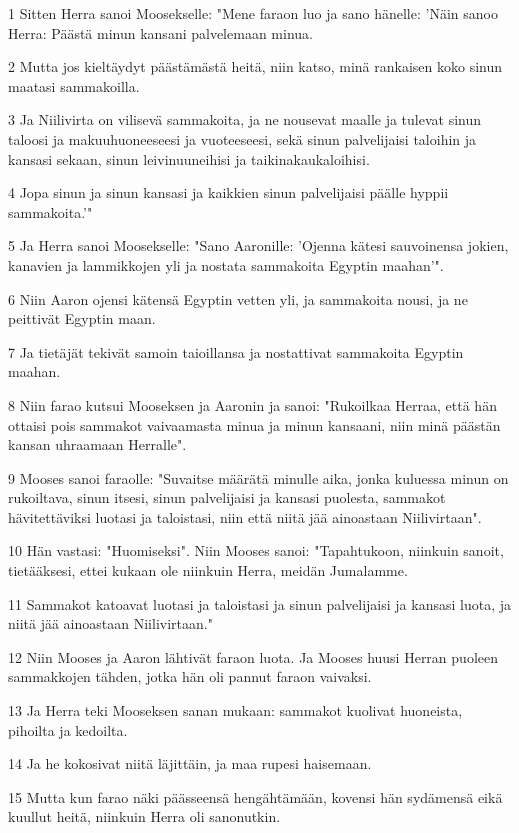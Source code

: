 \par 1 Sitten Herra sanoi Moosekselle: "Mene faraon luo ja sano hänelle: 'Näin sanoo Herra: Päästä minun kansani palvelemaan minua.
\par 2 Mutta jos kieltäydyt päästämästä heitä, niin katso, minä rankaisen koko sinun maatasi sammakoilla.
\par 3 Ja Niilivirta on vilisevä sammakoita, ja ne nousevat maalle ja tulevat sinun taloosi ja makuuhuoneeseesi ja vuoteeseesi, sekä sinun palvelijaisi taloihin ja kansasi sekaan, sinun leivinuuneihisi ja taikinakaukaloihisi.
\par 4 Jopa sinun ja sinun kansasi ja kaikkien sinun palvelijaisi päälle hyppii sammakoita.'"
\par 5 Ja Herra sanoi Moosekselle: "Sano Aaronille: 'Ojenna kätesi sauvoinensa jokien, kanavien ja lammikkojen yli ja nostata sammakoita Egyptin maahan'".
\par 6 Niin Aaron ojensi kätensä Egyptin vetten yli, ja sammakoita nousi, ja ne peittivät Egyptin maan.
\par 7 Ja tietäjät tekivät samoin taioillansa ja nostattivat sammakoita Egyptin maahan.
\par 8 Niin farao kutsui Mooseksen ja Aaronin ja sanoi: "Rukoilkaa Herraa, että hän ottaisi pois sammakot vaivaamasta minua ja minun kansaani, niin minä päästän kansan uhraamaan Herralle".
\par 9 Mooses sanoi faraolle: "Suvaitse määrätä minulle aika, jonka kuluessa minun on rukoiltava, sinun itsesi, sinun palvelijaisi ja kansasi puolesta, sammakot hävitettäviksi luotasi ja taloistasi, niin että niitä jää ainoastaan Niilivirtaan".
\par 10 Hän vastasi: "Huomiseksi". Niin Mooses sanoi: "Tapahtukoon, niinkuin sanoit, tietääksesi, ettei kukaan ole niinkuin Herra, meidän Jumalamme.
\par 11 Sammakot katoavat luotasi ja taloistasi ja sinun palvelijaisi ja kansasi luota, ja niitä jää ainoastaan Niilivirtaan."
\par 12 Niin Mooses ja Aaron lähtivät faraon luota. Ja Mooses huusi Herran puoleen sammakkojen tähden, jotka hän oli pannut faraon vaivaksi.
\par 13 Ja Herra teki Mooseksen sanan mukaan: sammakot kuolivat huoneista, pihoilta ja kedoilta.
\par 14 Ja he kokosivat niitä läjittäin, ja maa rupesi haisemaan.
\par 15 Mutta kun farao näki päässeensä hengähtämään, kovensi hän sydämensä eikä kuullut heitä, niinkuin Herra oli sanonutkin.
